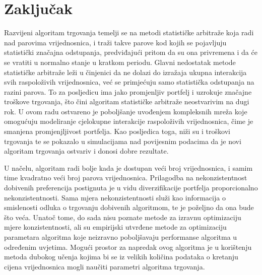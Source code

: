\documentclass[lmodern, utf8, diplomski, numeric]{fer}
\begin{document}
  \chapter{Zaključak}
  \label{ch:zakljucak}
  Razvijeni algoritam trgovanja temelji se na metodi statističke arbitraže koja radi nad parovima vrijednosnica, i traži takve parove kod kojih se pojavljuju statistički značajna odstupanja, predviđajući pritom da su ona privremena i da će se vratiti u normalno stanje u kratkom periodu.
  Glavni nedostatak metode statističke arbitraže leži u činjenici da ne dolazi do izražaja ukupna interakcija svih raspoloživih vrijednosnica, već se primjećuju samo statistička odstupanja na razini parova.
  To za posljedicu ima jako promjenljiv portfelj i uzrokuje značajne troškove trgovanja, što čini algoritam statističke arbitraže neostvarivim na dugi rok.
  U ovom radu ostvareno je poboljšanje uvođenjem kompleksnih mreža koje omogućuju modeliranje cjelokupne interakcije raspoloživih vrijednosnica, čime je smanjena promjenjljivost portfelja.
  Kao posljedica toga, niži su i troškovi trgovanja te se pokazalo u simulacijama nad povijesnim podacima da je novi algoritam trgovanja ostvariv i donosi dobre rezultate.
  
  U načelu, algoritam radi bolje kada je dostupan veći broj vrijednosnica, i samim time kvadratno veći broj parova vrijednosnica.
  Prilagodba na nekonzistentnost dobivenih preferencija postignuta je u vidu diverzifikacije portfelja proporcionalno nekonzistentnosti.
  Sama mjera nekonzistentnosti služi kao informacija o smislenosti odluka o trgovanju dobivenih algoritmom, te je poželjno da ona bude što veća.
  Unatoč tome, do sada nisu poznate metode za izravnu optimizaciju mjere konzistentnosti, ali su empirijski utvrđene metode za optimizaciju parametara algoritma koje neizravno poboljšavaju performanse algoritma u određenim uvjetima.
  Mogući prostor za napredak ovog algoritma je u korištenju metoda dubokog učenja kojima bi se iz velikih količina podataka o kretanju cijena vrijednosnica mogli naučiti parametri algoritma trgovanja.
  
  
  

  \appendix
\end{document}
